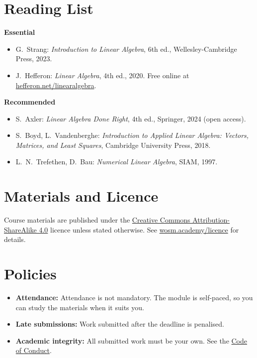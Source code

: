 \documentclass[11pt,a4paper]{article}
\begin{document}
\section{Reading List}
\textbf{Essential}
\begin{itemize}
  \item G.\ Strang: \textit{Introduction to Linear Algebra}, 6th ed., Wellesley-Cambridge Press, 2023.
  \item J.\ Hefferon: \textit{Linear Algebra}, 4th ed., 2020. Free online at \href{https://hefferon.net/linearalgebra/}{hefferon.net/linearalgebra}.
\end{itemize}
\textbf{Recommended}
\begin{itemize}
  \item S.\ Axler: \textit{Linear Algebra Done Right}, 4th ed., Springer, 2024 (open access).
  \item S.\ Boyd, L.\ Vandenberghe: \textit{Introduction to Applied Linear Algebra: Vectors, Matrices, and Least Squares}, Cambridge University Press, 2018.
  \item L.\ N.\ Trefethen, D.\ Bau: \textit{Numerical Linear Algebra}, SIAM, 1997.
\end{itemize}

\section{Materials and Licence}
Course materials are published under the
\href{https://creativecommons.org/licenses/by-sa/4.0/}{Creative Commons Attribution-ShareAlike 4.0}
licence unless stated otherwise. See \href{https://wosm.academy/licence/}{wosm.academy/licence} for details.

\section{Policies}
\begin{itemize}
  \item \textbf{Attendance:} Attendance is not mandatory. The module is self-paced, so you can study the materials when it suits you.
  \item \textbf{Late submissions:} Work submitted after the deadline is penalised.
  \item \textbf{Academic integrity:} All submitted work must be your own.
        See the \href{https://wosm.academy/code-of-conduct/}{Code of Conduct}.
\end{itemize}
\end{document}
